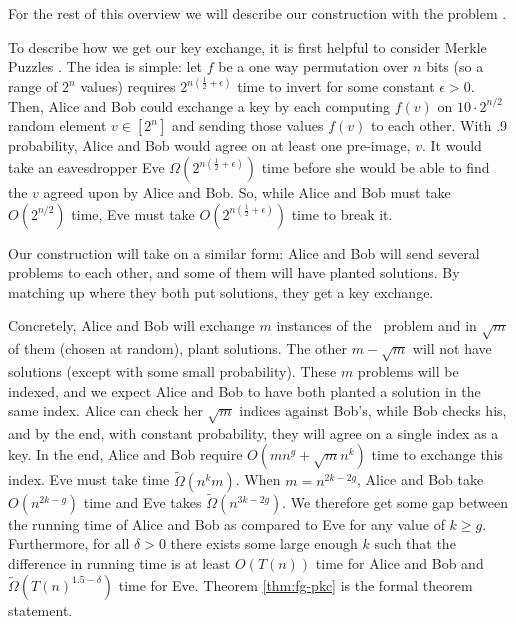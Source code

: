 For the rest of this overview we will describe our construction with the problem \zkclique. 

To describe how we get our key exchange, it is first helpful to consider Merkle Puzzles \cite{Merkle78,BGI08,optimalMerklePuzzles}. The idea is simple: let $f$ be a one way permutation over $n$ bits (so a range of $2^n$ values) requires $2^{n(\frac{1}{2}+\epsilon)}$ time to invert for some constant $\epsilon>0$. Then, Alice and Bob could exchange a key by each computing $f(v)$ on  $10\cdot2^{n/2}$ random element $v \in [2^{n}]$ and sending those values $f(v)$ to each other. With .9 probability, Alice and Bob would agree on at least one pre-image, $v$. It would take an eavesdropper Eve $\Omega(2^{n(\frac{1}{2}+\epsilon)})$ time before she would be able to find the $v$ agreed upon by Alice and Bob. So, while Alice and Bob must take $O(2^{n/2})$ time, Eve must take $O(2^{n(\frac{1}{2}+\epsilon)})$ time to break it. 



Our construction will take on a similar form: Alice and Bob will send several problems to each other, and some of them will have planted solutions. By matching up where they both put solutions, they get a key exchange.

Concretely, Alice and Bob will exchange $m$ instances of the \zkclique~problem and in $\sqrt{m}$ of them (chosen at random), plant solutions. The other $m - \sqrt{m}$ will not have solutions (except with some small probability). These $m$ problems will be indexed, and we expect Alice and Bob to have both planted a solution in the same index. Alice can check her $\sqrt{m}$ indices against Bob's, while Bob checks his, and by the end, with constant probability, they will agree on a single index as a key. In the end, Alice and Bob require $O(mn^g + \sqrt{m}n^{k})$ time to exchange this index.  Eve must take time $\tilde{\Omega}(n^{k}m)$. When  $m = n^{2k-2g}$, Alice and Bob take $O(n^{2k-g})$ time and Eve takes $\tilde{\Omega}(n^{3k-2g})$. We therefore get some gap between the running time of Alice and Bob as compared to Eve for any value of $k\geq g$. Furthermore, for all $\delta>0$ there exists some large enough $k$ such that the difference in running time is at least $O(T(n))$ time for Alice and Bob and $\tilde{\Omega}(T(n)^{1.5-\delta})$ time for Eve. Theorem \ref{thm:fg-pkc} is the formal theorem statement.



